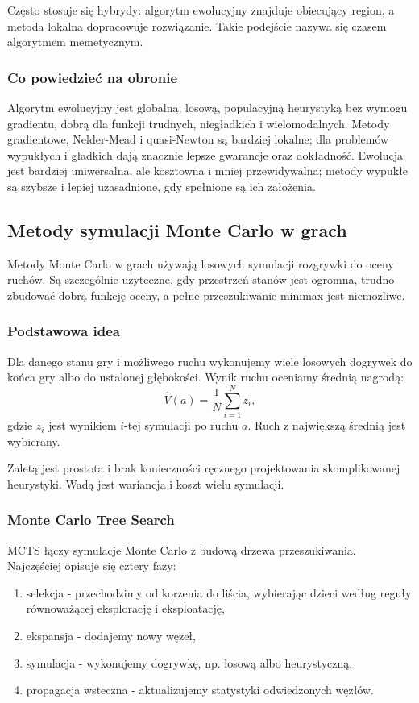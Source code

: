 Często stosuje się hybrydy: algorytm ewolucyjny znajduje obiecujący region, a metoda lokalna dopracowuje rozwiązanie. Takie podejście nazywa się czasem algorytmem memetycznym.

\subsubsection{Co powiedzieć na obronie}

Algorytm ewolucyjny jest globalną, losową, populacyjną heurystyką bez wymogu gradientu, dobrą dla funkcji trudnych, niegładkich i wielomodalnych. Metody gradientowe, Nelder-Mead i quasi-Newton są bardziej lokalne; dla problemów wypukłych i gładkich dają znacznie lepsze gwarancje oraz dokładność. Ewolucja jest bardziej uniwersalna, ale kosztowna i mniej przewidywalna; metody wypukłe są szybsze i lepiej uzasadnione, gdy spełnione są ich założenia.

\subsection{Metody symulacji Monte Carlo w grach}

Metody Monte Carlo w grach używają losowych symulacji rozgrywki do oceny ruchów. Są szczególnie użyteczne, gdy przestrzeń stanów jest ogromna, trudno zbudować dobrą funkcję oceny, a pełne przeszukiwanie minimax jest niemożliwe.

\subsubsection{Podstawowa idea}

Dla danego stanu gry i możliwego ruchu wykonujemy wiele losowych dogrywek do końca gry albo do ustalonej głębokości. Wynik ruchu oceniamy średnią nagrodą:
\[
\hat V(a)=\frac{1}{N}\sum_{i=1}^{N} z_i,
\]
gdzie $z_i$ jest wynikiem $i$-tej symulacji po ruchu $a$. Ruch z największą średnią jest wybierany.

Zaletą jest prostota i brak konieczności ręcznego projektowania skomplikowanej heurystyki. Wadą jest wariancja i koszt wielu symulacji.

\subsubsection{Monte Carlo Tree Search}

MCTS łączy symulacje Monte Carlo z budową drzewa przeszukiwania. Najczęściej opisuje się cztery fazy:
\begin{enumerate}
  \item selekcja - przechodzimy od korzenia do liścia, wybierając dzieci według reguły równoważącej eksplorację i eksploatację,
  \item ekspansja - dodajemy nowy węzeł,
  \item symulacja - wykonujemy dogrywkę, np. losową albo heurystyczną,
  \item propagacja wsteczna - aktualizujemy statystyki odwiedzonych węzłów.
\end{enumerate}

